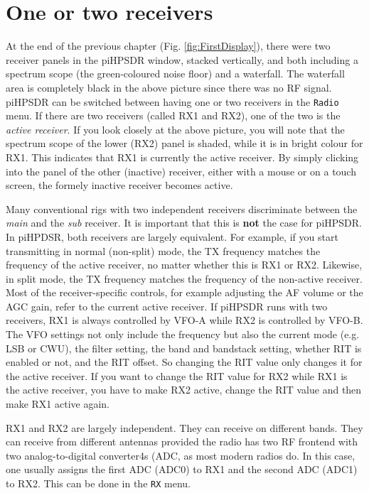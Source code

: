 \documentclass[12pt]{book}
\def\bltt#1{\texttt{\color{blue}#1}}
\begin{document}
\section{One or two receivers}
At the end of the previous chapter (Fig. \ref{fig:FirstDisplay}),
 there were two receiver panels in the
piHPSDR window, stacked vertically, and both including a spectrum scope
(the green-coloured noise floor) and a waterfall. The waterfall area
is completely black in the above picture since there was no RF signal.
piHPSDR can be switched between having one or two receivers in the
\texttt{Radio} menu. If there are two receivers (called RX1 and RX2),
 one of the two is the \textit{active receiver}. If you look closely
 at the above picture, you will note that the spectrum scope of
 the lower (RX2) panel is shaded, while it is in bright colour for RX1.
 This indicates that RX1 is currently the active receiver. By simply
 clicking into the panel of the other (inactive) receiver, either with
 a mouse or on a touch screen, the formely inactive receiver becomes
 active.
 
 Many conventional rigs with two independent receivers discriminate
 between the \textit{main} and the \textit{sub} receiver. It is important that
 this is \textbf{not} the case for piHPSDR. In piHPDSR, both  receivers are
 largely equivalent. For example, if you start transmitting in
 normal (non-split) mode, the TX frequency matches the frequency
 of the active receiver, no matter whether this is RX1 or RX2.
 Likewise, in split mode, the TX frequency matches the frequency
 of the non-active receiver. Most of the receiver-specific controls,
 for example adjusting the AF volume or the AGC gain, refer to the
 current active receiver. If piHPSDR runs with two receivers,
 RX1 is always controlled by VFO-A while RX2 is controlled by VFO-B.
 The VFO settings not only include the frequency but also the
 current mode (e.g. LSB or CWU), the filter setting, the band and
 bandstack setting, whether RIT is enabled or not, and the RIT
 offset. So changing the RIT value only changes it for the active
 receiver. If you want  to change the RIT value for RX2 while RX1 is
 the active receiver, you have to make RX2 active, change the RIT
 value and then make RX1 active again.
 
 RX1 and RX2 are largely independent. They can receive on different
 bands. They can receive from different antennas provided the radio
 has two RF frontend with two analog-to-digital converter4s (ADC,
 as most modern radios do. In this case, one usually
 assigns the first ADC (ADC0) to RX1 and the second ADC (ADC1) to
 RX2. This can be done in the \bltt{RX} menu.
 
\end{document}
